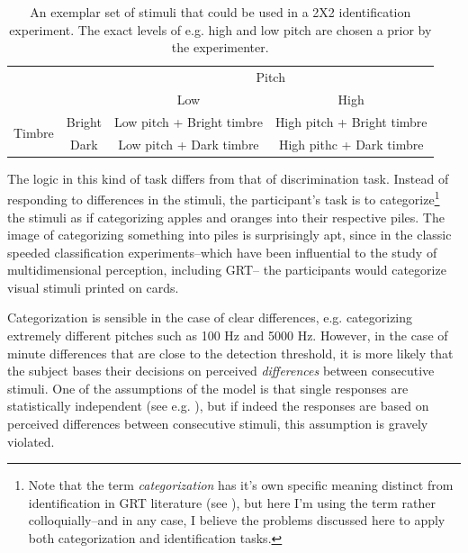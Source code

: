 \documentclass{article}\usepackage{knitr}
\begin{document}
\begin{table}[!htb]
 \centering
  \caption{An exemplar set of stimuli that could be used in a 2X2 identification experiment. The exact levels of e.g. high and low pitch are chosen a prior by the experimenter.}
  \vspace{0.5cm}
  \label{table:classicGRT}
   \begin{tabular}{rccc}
    \hline
     &       &         \multicolumn{2}{c}{Pitch} \\
                       \cline{3-4}
             &         & Low             & High   \\
     \hline
    \multirow{2}{*}{Timbre} 
            & Bright & \parbox[t]{5cm}{Low pitch + Bright timbre\\}& \parbox[t]{5cm}{High pitch + Bright timbre\\}\\
            & Dark    & \parbox[t]{5cm}{Low pitch + Dark timbre \\}  & \parbox[t]{5cm}{High pithc + Dark timbre \\ }\\
     \hline
    \end{tabular}
\end{table}

The logic in this kind of task differs from that of discrimination task. Instead of responding to differences in the stimuli, the participant's task is to categorize\footnote{Note that the term \textit{categorization} has it's own specific meaning distinct from identification in GRT literature (see \citet{ashby2015}), but here I'm using the term rather colloquially--and in any case, I believe the problems discussed here to apply both categorization and identification tasks.} the stimuli as if categorizing apples and oranges into their respective piles. The image of categorizing something into piles is surprisingly apt, since in the classic speeded classification experiments--which have been influential to the study of multidimensional perception, including GRT--\citep{garner1974} the participants would categorize visual stimuli printed on cards. 

Categorization is sensible in the case of clear differences, e.g. categorizing extremely different pitches such as 100 Hz and 5000 Hz. However, in the case of minute differences that are close to the detection threshold, it is more likely that the subject bases their decisions on perceived \textit{differences} between consecutive stimuli. One of the assumptions of the model is that single responses are statistically independent (see e.g. \citet[p. 218]{wickens1992}), but if indeed the responses are based on perceived differences between consecutive stimuli, this assumption is gravely violated.
\end{document}
